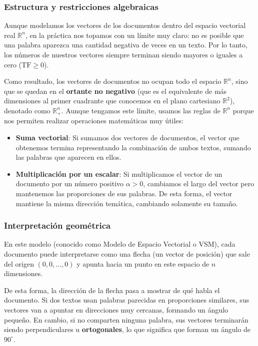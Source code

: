 \documentclass[12pt,a4paper]{article}
\begin{document}
\subsubsection{Estructura y restricciones algebraicas}

Aunque modelamos los vectores de los documentos dentro del espacio vectorial real $\mathbb{R}^n$, en la práctica nos topamos con un límite muy claro: no es posible que una palabra aparezca una cantidad negativa de veces en un texto. Por lo tanto, los números de nuestros vectores siempre terminan siendo mayores o iguales a cero ($\text{TF} \ge 0$).

Como resultado, los vectores de documentos no ocupan todo el espacio $\mathbb{R}^n$, sino que se quedan en el \textbf{ortante no negativo} (que es el equivalente de más dimensiones al primer cuadrante que conocemos en el plano cartesiano $\mathbb{R}^2$), denotado como $\mathbb{R}^n_+$. Aunque tengamos este límite, usamos las reglas de $\mathbb{R}^n$ porque nos permiten realizar operaciones matemáticas muy útiles:
\begin{itemize}
    \item \textbf{Suma vectorial}: Si sumamos dos vectores de documentos, el vector que obtenemos termina representando la combinación de ambos textos, sumando las palabras que aparecen en ellos.
    \item \textbf{Multiplicación por un escalar}: Si multiplicamos el vector de un documento por un número positivo $\alpha > 0$, cambiamos el largo del vector pero mantenemos las proporciones de sus palabras. De esta forma, el vector mantiene la misma dirección temática, cambiando solamente su tamaño.
\end{itemize}

\subsubsection{Interpretación geométrica}

En este modelo (conocido como Modelo de Espacio Vectorial o VSM), cada documento puede interpretarse como una flecha (un vector de posición) que sale del origen $(0, 0, \dots, 0)$ y apunta hacia un punto en este espacio de $n$ dimensiones.

De esta forma, la dirección de la flecha pasa a mostrar de qué habla el documento. Si dos textos usan palabras parecidas en proporciones similares, sus vectores van a apuntar en direcciones muy cercanas, formando un ángulo pequeño. En cambio, si no comparten ninguna palabra, sus vectores terminarán siendo perpendiculares u \textbf{ortogonales}, lo que significa que forman un ángulo de $90^\circ$.
\end{document}
